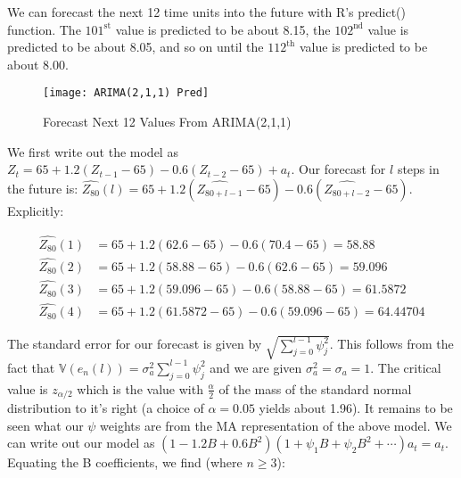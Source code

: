 \documentclass[12pt, letterpaper]{article}
\theoremstyle{definition}
\numberwithin{equation}{section}
\newcommand{\+}[1]{+_{\scalebox{.375}{#1}}}
\newcommand{\V}{\mathbb{V}}
\newcommand{\1}{\mathbbm{1}}
\begin{document}
We can forecast the next 12 time units into the future with R's predict() function. The $101^{\text{st}}$ value is predicted to be about 8.15, the $102^{\text{nd}}$ value is predicted to be about 8.05, and so on until the $112^{\text{th}}$ value is predicted to be about 8.00.

\begin{figure}[H]
	\centering
	\texttt{[image: ARIMA(2,1,1) Pred]}
	\caption{Forecast Next 12 Values From ARIMA(2,1,1)}
	\label{ARIMA(2,1,1) Pred}
\end{figure}







\newpage
\noindent\textbf{}

\vspace{\baselineskip}
\noindent\textbf{}
\vspace{\baselineskip}

We first write out the model as $Z_t=65+1.2(Z_{t-1}-65)-0.6(Z_{t-2}-65)+a_t$. Our forecast for $l$ steps in the future is: $\widehat{Z_{80}}(l)=65+1.2(\widehat{Z_{80+l-1}}-65)-0.6(\widehat{Z_{80+l-2}}-65)$. Explicitly:

\vspace{-0.5cm}
\begin{align*}
	\widehat{Z_{80}}(1)&=65+1.2(62.6-65)-0.6(70.4-65)=58.88\\
	\widehat{Z_{80}}(2)&=65+1.2(58.88-65)-0.6(62.6-65)=59.096\\
	\widehat{Z_{80}}(3)&=65+1.2(59.096-65)-0.6(58.88-65)=61.5872\\
	\widehat{Z_{80}}(4)&=65+1.2(61.5872-65)-0.6(59.096-65)=64.44704
\end{align*}	
\vspace{-0.75cm}
	
\vspace{\baselineskip}
\noindent\textbf{}
\vspace{\baselineskip}

The standard error for our forecast is given by $\sqrt{\sum\limits_{j=0}^{l-1}\psi_j^2}$. This follows from the fact that $\V(e_n(l))=\sigma_a^2\sum\limits_{j=0}^{l-1}\psi_j^2$ and we are given $\sigma_a^2=\sigma_a=1$. The critical value is $z_{\alpha/2}$ which is the value with $\frac{\alpha}{2}$ of the mass of the standard normal distribution to it's right (a choice of $\alpha=0.05$ yields about 1.96). It remains to be seen what our $\psi$ weights are from the MA representation of the above model. We can write out our model as $(1-1.2B+0.6B^2)(1+\psi_1B+\psi_2B^2+\cdots)a_t=a_t$. Equating the B coefficients, we find (where $n \geq 3$):
\end{document}
